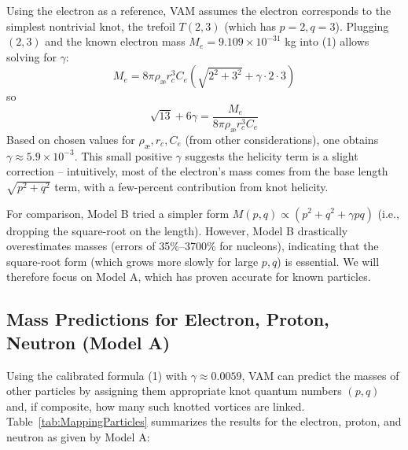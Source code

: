 \documentclass[a4paper,12pt]{article}
\begin{document}
        Using the electron as a reference, VAM assumes the electron corresponds to the simplest nontrivial knot, the trefoil $T(2,3)$ (which has $p=2,q=3$). Plugging $(2,3)$ and the known electron mass $M_e = 9.109\times10^{-31}$ kg into (1) allows solving for $\gamma$:
        \[
        M_e = 8\pi \rho_{\text{\ae}} r_c^3 C_e \left(\sqrt{2^2+3^2} + \gamma \cdot 2\cdot3\right)
        \]
        so
        \[
        \sqrt{13} + 6\gamma = \frac{M_e}{8\pi \rho_{\text{\ae}} r_c^3 C_e}
        \]
        Based on chosen values for $\rho_{\text{\ae}}, r_c, C_e$ (from other considerations), one obtains $\gamma \approx 5.9\times10^{-3}$. This small positive $\gamma$ suggests the helicity term is a slight correction -- intuitively, most of the electron's mass comes from the base length $\sqrt{p^2+q^2}$ term, with a few-percent contribution from knot helicity.
        
        For comparison, Model B tried a simpler form $M(p,q) \propto (p^2 + q^2 + \gamma p q)$ (i.e., dropping the square-root on the length). However, Model B drastically overestimates masses (errors of 35\%--3700\% for nucleons), indicating that the square-root form (which grows more slowly for large $p,q$) is essential. We will therefore focus on Model A, which has proven accurate for known particles.
        
        \subsection{Mass Predictions for Electron, Proton, Neutron (Model A)}

        Using the calibrated formula (1) with $\gamma\approx0.0059$, VAM can predict the masses of other particles by assigning them appropriate knot quantum numbers $(p,q)$ and, if composite, how many such knotted vortices are linked. Table~\ref{tab:MappingParticles} summarizes the results for the electron, proton, and neutron as given by Model A:
\end{document}
